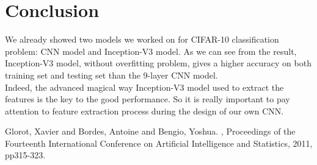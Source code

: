 \documentclass[hyperref]{article}
\theoremstyle{nonumberplain}
\begin{document}
\section{Conclusion}
We already showed two models we worked on for CIFAR-10 classification problem: CNN model and Inception-V3 model. As we can see from the result, Inception-V3 model, without overfitting problem, gives a higher accuracy on both training set and testing set than the 9-layer CNN model. \\
Indeed, the advanced magical way Inception-V3 model used to extract the features is the key to the good performance. So it is really important to pay attention to feature extraction process during the design of our own CNN.


\begin{thebibliography}{99}

\setlength{\baselineskip}{14pt}
Glorot, Xavier and Bordes, Antoine and Bengio, Yoshua.
, Proceedings of the Fourteenth International Conference on Artificial Intelligence and Statistics, 2011, pp315-323.
\end{thebibliography}

\newpage
\end{document}
